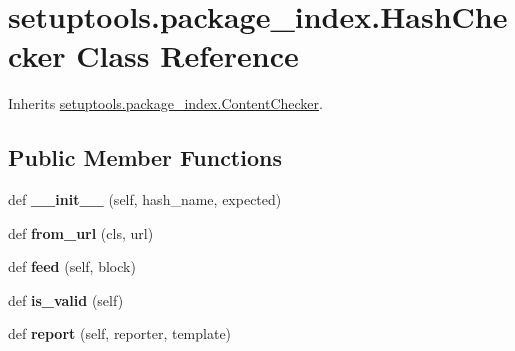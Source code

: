\hypertarget{classsetuptools_1_1package__index_1_1_hash_checker}{}\section{setuptools.\+package\+\_\+index.\+Hash\+Checker Class Reference}
\label{classsetuptools_1_1package__index_1_1_hash_checker}


Inherits \hyperlink{classsetuptools_1_1package__index_1_1_content_checker}{setuptools.\+package\+\_\+index.\+Content\+Checker}.

\subsection*{Public Member Functions}
\begin{DoxyCompactItemize}
\item 
\mbox{\label{classsetuptools_1_1package__index_1_1_hash_checker_a7e9ce6338bf56b374758ac916dc6ab80}} 
def {\bfseries \+\_\+\+\_\+init\+\_\+\+\_\+} (self, hash\+\_\+name, expected)
\item 
\mbox{\label{classsetuptools_1_1package__index_1_1_hash_checker_af5123e3a85ab6ab53545efc45781e113}} 
def {\bfseries from\+\_\+url} (cls, url)
\item 
\mbox{\label{classsetuptools_1_1package__index_1_1_hash_checker_ab85ad235e2596bf0adc4b69aa23f9600}} 
def {\bfseries feed} (self, block)
\item 
\mbox{\label{classsetuptools_1_1package__index_1_1_hash_checker_a6da0aaa415974e755b5eb11ddadf0826}} 
def {\bfseries is\+\_\+valid} (self)
\item 
\mbox{\label{classsetuptools_1_1package__index_1_1_hash_checker_a6d7009b9387567ecf6d659b2210b6548}} 
def {\bfseries report} (self, reporter, template)
\end{DoxyCompactItemize}
